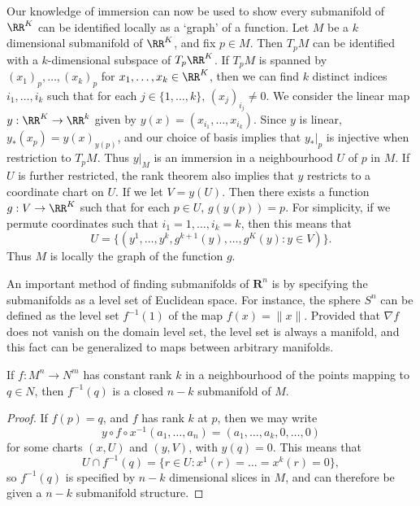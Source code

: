\begin{example}
    Our knowledge of immersion can now be used to show every submanifold of $\RR^K$ can be identified locally as a `graph' of a function. Let $M$ be a $k$ dimensional submanifold of $\RR^K$, and fix $p \in M$. Then $T_p M$ can be identified with a $k$-dimensional subspace of $T_p \RR^K$. If $T_p M$ is spanned by $(x_1)_p, \dots, (x_k)_p$ for $x_1, \dots, x_k \in \RR^K$, then we can find $k$ distinct indices $i_1, \dots, i_k$ such that for each $j \in \{ 1, \dots, k \}$, $(x_j)_{i_j} \neq 0$. We consider the linear map $y: \RR^K \to \RR^k$ given by $y(x) = (x_{i_1}, \dots, x_{i_k})$. Since $y$ is linear, $y_*(x_p) = y(x)_{y(p)}$, and our choice of basis implies that $y_*|_p$ is injective when restriction to $T_p M$. Thus $y|_M$ is an immersion in a neighbourhood $U$ of $p$ in $M$. If $U$ is further restricted, the rank theorem also implies that $y$ restricts to a coordinate chart on $U$. If we let $V = y(U)$. Then there exists a function $g: V \to \RR^K$ such that for each $p \in U$, $g(y(p)) = p$. For simplicity, if we permute coordinates such that $i_1 = 1, \dots, i_k = k$, then this means that
    \[ U = \{ (y^1, \dots, y^k, g^{k+1}(y), \dots, g^K(y): y \in V) \}. \]
    Thus $M$ is locally the graph of the function $g$.
\end{example}

An important method of finding submanifolds of $\mathbf{R}^n$ is by specifying the submanifolds as a level set of Euclidean space. For instance, the sphere $S^n$ can be defined as the level set $f^{-1}(1)$ of the map $f(x) = \| x \|$. Provided that $\nabla f$ does not vanish on the domain level set, the level set is always a manifold, and this fact can be generalized to maps between arbitrary manifolds.

\begin{theorem}
    If $f: M^n \to N^m$ has constant rank $k$ in a neighbourhood of the points mapping to $q \in N$, then $f^{-1}(q)$ is a closed $n - k$ submanifold of $M$.
\end{theorem}
\begin{proof}
    If $f(p) = q$, and $f$ has rank $k$ at $p$, then we may write
    \[ y \circ f \circ x^{-1}(a_1, \dots, a_n) = (a_1, \dots, a_k, 0 ,\dots, 0) \]
    for some charts $(x,U)$ and $(y,V)$, with $y(q) = 0$. This means that
    \[ U \cap f^{-1}(q) = \{ r \in U : x^1(r) = \dots = x^k(r) = 0 \}, \]
    so $f^{-1}(q)$ is specified by $n-k$ dimensional slices in $M$, and can therefore be given a $n-k$ submanifold structure.
\end{proof}

